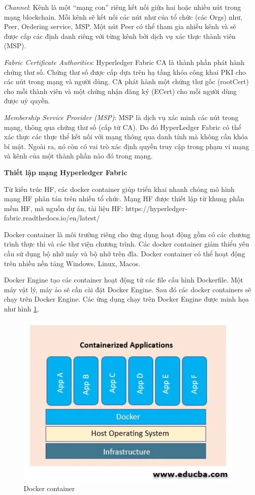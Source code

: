 \emph{Channel}: Kênh là một “mạng con” riêng kết nối giữa hai hoặc nhiều nút trong mạng blockchain. 
Mỗi kênh sẽ kết nối các nút như của tổ chức (các Orgs) như, Peer, Ordering service, MSP. 
Một nút Peer có thể tham gia nhiều kênh và sẽ được cấp các định danh riêng với từng kênh bởi dịch vụ xác thực thành viên (MSP).

\emph{Fabric Certificate Authorities}: Hyperledger Fabric CA là thành phần phát hành chứng thư số. 
Chứng thư số được cấp dựa trên hạ tầng khóa công khai PKI cho các nút trong mạng và người dùng. 
CA phát hành một chứng thư gốc (rootCert) cho mỗi thành viên và một chứng nhận đăng ký (ECert) cho mỗi người dùng được uỷ quyền.

\emph{Membership Service Provider (MSP)}: MSP là dịch vụ xác minh các nút trong mạng, thông qua chứng thư số (cấp từ CA). 
Do đó HyperLedger Fabric có thể xác thực các thực thể kết nối với mạng thông qua danh tính mà không cần khóa bí mật. 
Ngoài ra, nó còn có vai trò xác định quyền truy cập trong phạm vi mạng và kênh của một thành phần nào đó trong mạng.

\textbf{Thiết lập mạng Hyperledger Fabric}

Từ kiến trúc HF, các docker container giúp triển khai nhanh chóng  mô hình mạng HF phân tán trên nhiều tổ chức. 
Mạng HF được thiết lập từ khung phần mềm HF, mã nguồn dự án, tài liệu HF: https://hyperledger-fabric.readthedocs.io/en/latest/ 

Docker container là môi trường riêng cho ứng dụng hoạt động gồm có các chương trình thực thi và các thư viện chương trình. 
Các docker container giảm thiểu yêu cầu sử dụng bộ nhớ máy và bộ nhớ trên đĩa.
Docker container có thể hoạt động trên nhiều nền tảng Windows, Linux, Macos.

Docker Engine tạo các container hoạt động từ các file cấu hình Dockerfile. 
Một máy vật lý,  máy ảo sẽ cần cài đặt Docker Engine. 
Sau đó các docker containers sẽ chạy trên Docker Engine.
Các ứng dụng chạy trên Docker Engine được minh họa như hình \ref{fig:docker.png},


\begin{figure}[htbp]
\centering
\includegraphics[width=.9\linewidth]{img/docker.png}
\caption{Docker container}
\label{fig:docker.png}
\end{figure}


